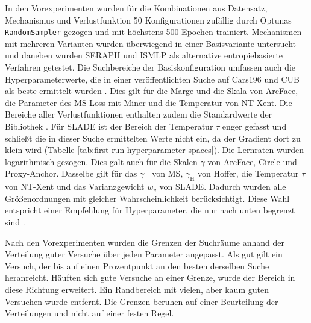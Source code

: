 In den Vorexperimenten wurden für die Kombinationen aus Datensatz, Mechanismus und Verlustfunktion 50 Konfigurationen zufällig durch Optunas \texttt{RandomSampler} gezogen und mit höchstens 500 Epochen trainiert. Mechanismen mit mehreren Varianten wurden überwiegend in einer Basisvariante untersucht und daneben wurden \ac{SERAPH} und \ac{ISMLP} als alternative entropiebasierte Verfahren getestet. Die Suchbereiche der Basiskonfiguration umfassen auch die Hyperparameterwerte, die in einer veröffentlichten Suche auf Cars196 und \ac{CUB} als beste ermittelt wurden \cite{musgrave_metric_2020}. Dies gilt für die Marge und die Skala von ArcFace, die Parameter des \ac{MS} Loss mit Miner und die Temperatur von \ac{NT-Xent}. Die Bereiche aller Verlustfunktionen enthalten zudem die Standardwerte der Bibliothek \cite{musgrave_pytorch_2020}. Für \ac{SLADE} ist der Bereich der Temperatur $\tau$ enger gefasst und schließt die in dieser Suche ermittelten Werte nicht ein, da der Gradient dort zu klein wird (Tabelle \ref{tab:first-run-hyperparameter-spaces}). Die Lernraten wurden logarithmisch gezogen. Dies galt auch für die Skalen $\gamma$ von ArcFace, Circle und Proxy-Anchor. Dasselbe gilt für das $\gamma^{-}$ von \ac{MS}, $\gamma_{\mathrm{H}}$ von Hoffer, die Temperatur $\tau$ von \ac{NT-Xent} und das Varianzgewicht $w_v$ von \ac{SLADE}. Dadurch wurden alle Größenordnungen mit gleicher Wahrscheinlichkeit berücksichtigt. Diese Wahl entspricht einer Empfehlung für Hyperparameter, die nur nach unten begrenzt sind \cite{bischl_hyperparameter_2023}. 

Nach den Vorexperimenten wurden die Grenzen der Suchräume anhand der Verteilung guter Versuche über jeden Parameter angepasst. Als gut gilt ein Versuch, der bis auf einen Prozentpunkt an den besten derselben Suche heranreicht. Häuften sich gute Versuche an einer Grenze, wurde der Bereich in diese Richtung erweitert. Ein Randbereich mit vielen, aber kaum guten Versuchen wurde entfernt. Die Grenzen beruhen auf einer Beurteilung der Verteilungen und nicht auf einer festen Regel.

